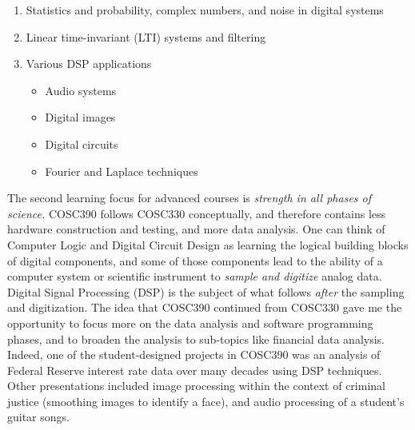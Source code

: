 \documentclass[../../../main.tex]{subfiles}
\begin{document}
\begin{enumerate}
\item Statistics and probability, complex numbers, and noise in digital systems
\item Linear time-invariant (LTI) systems and filtering
\item Various DSP applications
\begin{itemize}
\item Audio systems
\item Digital images
\item Digital circuits
\item Fourier and Laplace techniques
\end{itemize}
\end{enumerate}

The second learning focus for advanced courses is \textit{strength in all phases of science.}  COSC390 follows COSC330 conceptually, and therefore contains less hardware construction and testing, and more data analysis.  One can think of Computer Logic and Digital Circuit Design as learning the logical building blocks of digital components, and some of those components lead to the ability of a computer system or scientific instrument to \textit{sample and digitize} analog data.  Digital Signal Processing (DSP) is the subject of what follows \textit{after} the sampling and digitization.  The idea that COSC390 continued from COSC330 gave me the opportunity to focus more on the data analysis and software programming phases, and to broaden the analysis to sub-topics like financial data analysis.  Indeed, one of the student-designed projects in COSC390 was an analysis of Federal Reserve interest rate data over many decades using DSP techniques.  Other presentations included image processing within the context of criminal justice (smoothing images to identify a face), and audio processing of a student's guitar songs.  \\ \hspace{0.1cm}
\end{document}

